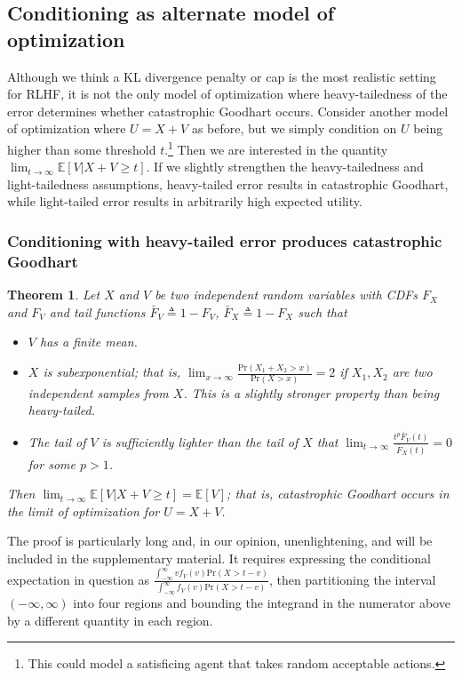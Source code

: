 \documentclass{article}
\newtheorem{theorem}{Theorem}
\begin{document}
\subsection{Conditioning as alternate model of optimization\label{sec:theoretical-conditioning}}

Although we think a KL divergence penalty or cap is the most realistic setting for RLHF, it is not the only model of optimization where heavy-tailedness of the error determines whether catastrophic Goodhart occurs. Consider another model of optimization where $U = X+V$ as before, but we simply condition on $U$ being higher than some threshold $t$.\footnote{This could model a satisficing agent that takes random acceptable actions.} Then we are interested in the quantity $\lim_{t \to \infty} \mathbb E[V | X + V \ge t]$. If we slightly strengthen the heavy-tailedness and light-tailedness assumptions, heavy-tailed error results in catastrophic Goodhart, while light-tailed error results in arbitrarily high expected utility.

\subsubsection{Conditioning with heavy-tailed error produces catastrophic Goodhart}
\begin{theorem}
    \label{thm5} Let $X$ and $V$ be two independent random variables with CDFs $F_X$ and $F_V$ and tail functions $\bar F_V \triangleq 1 - F_V$, $\bar F_X \triangleq 1 - F_X$ such that
    \begin{itemize}
        \item $V$ has a finite mean.
        \item $X$ is subexponential; that is, $\lim_{x\to\infty}\frac{\text{Pr}(X_1+X_2>x)}{\text{Pr}(X>x)} = 2$ if $X_1, X_2$ are two independent samples from $X$. This is a slightly stronger property than being heavy-tailed.
        \item The tail of $V$ is sufficiently lighter than the tail of $X$ that \(\lim_{t\to\infty}\frac{t^p\bar F_V(t)}{\bar F_X(t)} = 0\) for some \(p > 1\).
    \end{itemize}
    Then $\lim_{t \to \infty} \mathbb E[V | X + V \ge t] =\mathbb{E}[V]$; that is, catastrophic Goodhart occurs in the limit of optimization for $U=X+V$.
\end{theorem}

The proof is particularly long and, in our opinion, unenlightening, and will be included in the supplementary material. It requires expressing the conditional expectation in question as $\frac{\int_{-\infty}^\infty vf_V(v)\text{Pr}(X>t-v)} {\int_{-\infty}^\infty f_V(v)\text{Pr}(X>t-v)}$, then partitioning the interval $(-\infty, \infty)$ into four regions and bounding the integrand in the numerator above by a different quantity in each region. 
\end{document}
